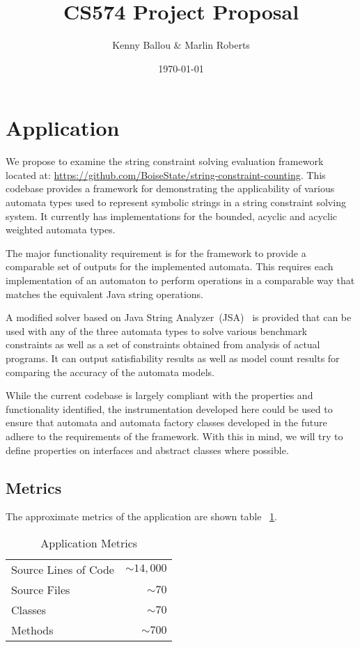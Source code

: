 \documentclass[letterpaper,11pt,twocolumn]{article}
\title{CS574 Project Proposal}
\date{\today}
\author{Kenny Ballou \& Marlin Roberts}
\begin{document}
\maketitle{}
\tableofcontents{}

\section{Application}

We propose to examine the string constraint solving evaluation framework
located at: \url{https://github.com/BoiseState/string-constraint-counting}.
This codebase provides a framework for demonstrating the applicability of
various automata types used to represent symbolic strings in a string
constraint solving system.  It currently has implementations for the bounded,
acyclic and acyclic weighted automata types.

The major functionality requirement is for the framework to provide a
comparable set of outputs for the implemented automata.  This requires each
implementation of an automaton to perform operations in a comparable way that
matches the equivalent Java string operations.

A modified solver based on Java String Analyzer~(JSA)~\cite{strings2003} is
provided that can be used with any of the three automata types to solve various
benchmark constraints as well as a set of constraints obtained from analysis of
actual programs.  It can output satisfiability results as well as model count
results for comparing the accuracy of the automata models.

While the current codebase is largely compliant with the properties and
functionality identified, the instrumentation developed here could be used to
ensure that automata and automata factory classes developed in the future
adhere to the requirements of the framework.  With this in mind, we will try to
define properties on interfaces and abstract classes where possible.

\subsection{Metrics}

The approximate metrics of the application are shown table
~\ref{tab:app-metrics}.


\begin{table}[ht]\label{tab:app-metrics}
  \centering
  \begin{tabular}{lr}
    \toprule
    Source Lines of Code & \(\sim14,000\) \\
    Source Files         & \(\sim70\) \\
    Classes              & \(\sim70\) \\
    Methods              & \(\sim700\) \\
    \bottomrule
  \end{tabular}
  \caption{Application Metrics}
\end{table}
\end{document}
